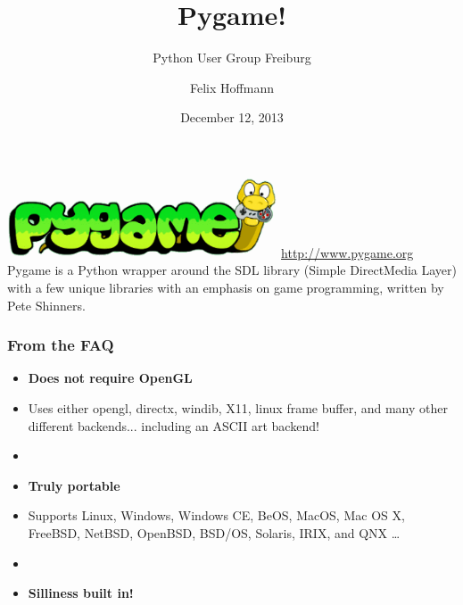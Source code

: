 \documentclass[handout]{beamer}   %
\title{Pygame!}
\subtitle{Python User Group Freiburg}
\author[Felix Hoffmann]{Felix Hoffmann}
\institute{\url{http://about.me/felixhoffmann}}
\date{December 12, 2013}
\begin{document}






\begin{frame}[plain]
  \titlepage
\end{frame}




\begin{frame}[plain]
\begin{center}
\includegraphics[width=0.6\textwidth]{img/pygame.png}
\vspace{1cm}
\url{http://www.pygame.org}\\
\vspace{1.4cm}
Pygame is a Python wrapper around the SDL library (Simple DirectMedia Layer) with a few unique libraries with an emphasis on game programming, written by Pete Shinners.
\end{center}
\end{frame}


\begin{frame}

\frametitle{From the FAQ}

\begin{itemize}

\item[] \textbf{Does not require OpenGL} 
\item[] Uses either opengl, directx, windib, X11, linux frame buffer, and many other different backends... including an ASCII art backend!
\item[]
\item[] \textbf{Truly portable}
\item[] Supports Linux, Windows, Windows CE, BeOS, MacOS, Mac OS X, FreeBSD, NetBSD, OpenBSD, BSD/OS, Solaris, IRIX, and QNX \dots
\item[]
\item[] \textbf{Silliness built in!}
\end{itemize}
\end{frame}
\end{document}
